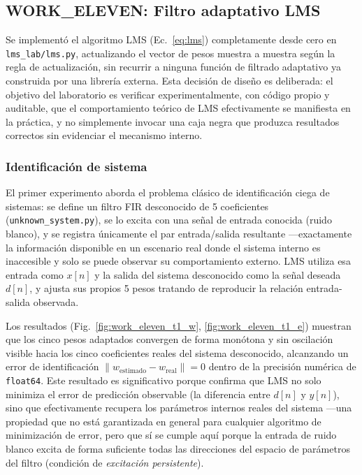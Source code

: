 
\subsection{WORK\_ELEVEN: Filtro adaptativo LMS}

Se implementó el algoritmo LMS (Ec.~\ref{eq:lms}) completamente desde
cero en \texttt{lms\_lab/lms.py}, actualizando el vector de pesos
muestra a muestra según la regla de actualización, sin recurrir a
ninguna función de filtrado adaptativo ya construida por una librería
externa. Esta decisión de diseño es deliberada: el objetivo del
laboratorio es verificar experimentalmente, con código propio y
auditable, que el comportamiento teórico de LMS efectivamente se
manifiesta en la práctica, y no simplemente invocar una caja negra que
produzca resultados correctos sin evidenciar el mecanismo interno.

\subsubsection{Identificación de sistema}

El primer experimento aborda el problema clásico de identificación
ciega de sistemas: se define un filtro FIR desconocido de 5
coeficientes (\texttt{unknown\_system.py}), se lo excita con una señal
de entrada conocida (ruido blanco), y se registra únicamente el par
entrada/salida resultante —exactamente la información disponible en un
escenario real donde el sistema interno es inaccesible y solo se puede
observar su comportamiento externo. LMS utiliza esa entrada como
$x[n]$ y la salida del sistema desconocido como la señal deseada
$d[n]$, y ajusta sus propios 5 pesos tratando de reproducir la
relación entrada-salida observada.

Los resultados (Fig.~\ref{fig:work_eleven_t1_w},
\ref{fig:work_eleven_t1_e}) muestran que los cinco pesos adaptados
convergen de forma monótona y sin oscilación visible hacia los cinco
coeficientes reales del sistema desconocido, alcanzando un error de
identificación $\lVert w_{\text{estimado}} - w_{\text{real}} \rVert = 0$
dentro de la precisión numérica de \texttt{float64}. Este resultado es
significativo porque confirma que LMS no solo minimiza el error de
predicción observable (la diferencia entre $d[n]$ y $y[n]$), sino que
efectivamente recupera los parámetros internos reales del sistema —una
propiedad que no está garantizada en general para cualquier algoritmo
de minimización de error, pero que sí se cumple aquí porque la entrada
de ruido blanco excita de forma suficiente todas las direcciones del
espacio de parámetros del filtro (condición de \textit{excitación
persistente}).

